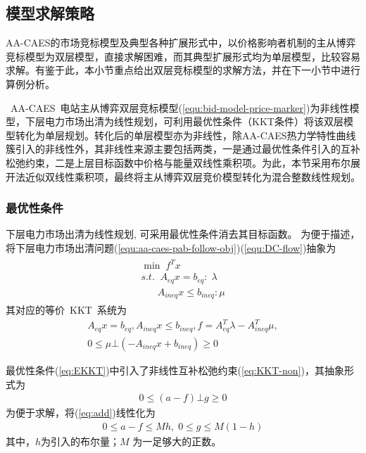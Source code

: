 \subsection{模型求解策略}
AA-CAES的市场竞标模型及典型各种扩展形式中，以价格影响者机制的主从博弈竞标模型为双层模型，直接求解困难，而其典型扩展形式均为单层模型，比较容易求解。有鉴于此，本小节重点给出双层竞标模型的求解方法，并在下一小节中进行算例分析。

~AA-CAES~电站主从博弈双层竞标模型(\ref{equ:bid-model-price-marker})为非线性模型，下层电力市场出清为线性规划，可利用最优性条件（KKT条件）将该双层模型转化为单层规划\cite{CAES-DAM-Rui-18}。转化后的单层模型亦为非线性，除AA-CAES热力学特性曲线簇引入的非线性外，其非线性来源主要包括两类，一是通过最优性条件引入的互补松弛约束，二是上层目标函数中价格与能量双线性乘积项\cite{CAES-DAM-Rui-18}。为此，本节采用布尔展开法近似双线性乘积项\cite{Binary-Expansion-1}，最终将主从博弈双层竞价模型转化为混合整数线性规划。

\subsubsection{最优性条件}
下层电力市场出清为线性规划, 可采用最优性条件消去其目标函数。 为便于描述，将下层电力市场出清问题(\ref{equ:aa-caes-pab-follow-obj})(\ref{equ:DC-flow})抽象为
\begin{eqnarray}
\begin{array}{l}
\min \;{f^T}x\\
s.t.\;\;{A_{eq}}x = {b_{eq}}:\;\lambda \\
\;\;\;\;\;\;{A_{ineq}}x \le {b_{ineq}}:\mu
\end{array}
\end{eqnarray}
其对应的等价~KKT~系统为
\begin{subequations}
\label{eq:EKKT}
\begin{gather}
{A_{eq}}x = {b_{eq}}, {A_{ineq}}x \le {b_{ineq}}, f = A_{eq}^T\lambda  - A_{ineq}^T\mu, \\
 0 \le {\mu} \bot ({ - {A_{ineq}}x + {b_{ineq}}}) \ge 0 \label{eq:KKT-non}
\end{gather}
\end{subequations}

最优性条件(\ref{eq:EKKT})中引入了非线性互补松弛约束(\ref{eq:KKT-non})，其抽象形式为
\begin{eqnarray}
\label{eq:add}
0 \le \left( {a - f} \right) \bot g \ge 0
\end{eqnarray}
为便于求解，将(\ref{eq:add})线性化为
\begin{eqnarray}
\label{equ:aa-caes-big-M}
0 \le a - f \le Mh,\;0\le g \le M\left( {1 - h} \right)
\end{eqnarray}
其中，$h$为引入的布尔量；$M$ 为一足够大的正数。

